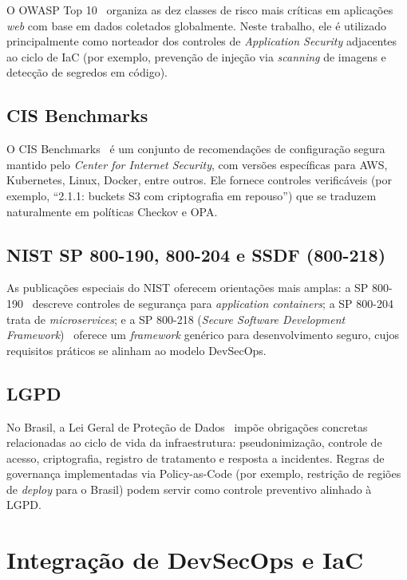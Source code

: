 O OWASP Top 10~ organiza as dez classes de risco mais críticas em aplicações \textit{web} com base em dados coletados globalmente. Neste trabalho, ele é utilizado principalmente como norteador dos controles de \textit{Application Security} adjacentes ao ciclo de IaC (por exemplo, prevenção de injeção via \textit{scanning} de imagens e detecção de segredos em código).

\subsection{CIS Benchmarks}

O CIS Benchmarks~ é um conjunto de recomendações de configuração segura mantido pelo \textit{Center for Internet Security}, com versões específicas para AWS, Kubernetes, Linux, Docker, entre outros. Ele fornece controles verificáveis (por exemplo, ``2.1.1: buckets S3 com criptografia em repouso'') que se traduzem naturalmente em políticas Checkov e OPA.

\subsection{NIST SP 800-190, 800-204 e SSDF (800-218)}

As publicações especiais do NIST oferecem orientações mais amplas: a SP 800-190~ descreve controles de segurança para \textit{application containers}; a SP 800-204~ trata de \textit{microservices}; e a SP 800-218 (\textit{Secure Software Development Framework})~ oferece um \textit{framework} genérico para desenvolvimento seguro, cujos requisitos práticos se alinham ao modelo DevSecOps.

\subsection{LGPD}

No Brasil, a Lei Geral de Proteção de Dados~ impõe obrigações concretas relacionadas ao ciclo de vida da infraestrutura: pseudonimização, controle de acesso, criptografia, registro de tratamento e resposta a incidentes. Regras de governança implementadas via Policy-as-Code (por exemplo, restrição de regiões de \textit{deploy} para o Brasil) podem servir como controle preventivo alinhado à LGPD.

\section{Integração de DevSecOps e IaC}

